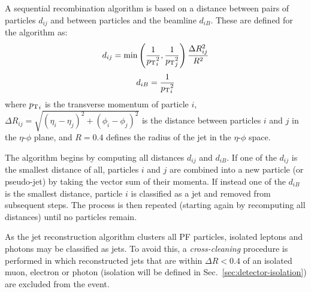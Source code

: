 A sequential recombination algorithm is based on a distance between pairs of 
particles $d_{ij}$ and between particles and the beamline $d_{iB}$. These are 
defined for the \antikt algorithm as:
\begin{equation}
d_{ij} = \mathrm{min} \left( \frac{1}{{p_{\text T}}_i^2}, \frac{1}{{p_{\text T}}_j^2} \right) 
\frac{\Delta R_{ij}^2}{R^2}
\end{equation}
\begin{equation}
d_{iB} = \frac{1}{{p_{\text T}}_i^2}
\end{equation}
where ${p_{\text T}}_i$ is the transverse momentum of particle $i$, 
$\Delta R_{ij}=\sqrt{(\eta_i - \eta_j)^2 + (\phi_i - \phi_j)^2}$ is the 
distance between particles $i$ and $j$ in the {$\eta$-$\phi$} plane, and 
$R=0.4$ defines the radius of the jet in the {$\eta$-$\phi$} space.

The algorithm begins by computing all distances $d_{ij}$ and $d_{iB}$. If one 
of the $d_{ij}$ is the smallest distance of all, particles $i$ and $j$ are 
combined into a new particle (or pseudo-jet) by taking the vector sum of their 
momenta. 
If instead one of the $d_{iB}$ is the smallest distance, particle $i$ is 
classified as a jet and removed from subsequent steps. The process is then 
repeated (starting again by recomputing all distances) until no particles 
remain.



As the jet reconstruction algorithm clusters all PF particles, isolated leptons 
and photons may be classified as jets. To avoid this, a \textit{cross-cleaning} 
procedure is performed in which reconstructed jets that are within $\Delta R < 
0.4$ of an isolated muon, electron or photon (isolation will be defined in 
Sec.~\ref{sec:detector-isolation}) are excluded from the event.

